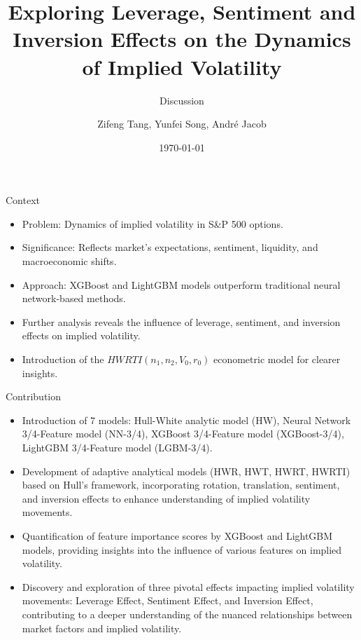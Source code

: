 \documentclass{beamer}
\title{Exploring Leverage, Sentiment and Inversion Effects on the Dynamics of Implied Volatility}
\subtitle{Discussion}
\author[Z.~Tang,~Y.Song \and A.~Jacob]{Zifeng Tang, Yunfei Song, André Jacob}
\institute[ETH/UZH]{ETH Zürich, University of Zürich}
\date{\today}
\begin{document}
\frame{\titlepage}

\begin{frame}{Context}
    \begin{itemize}
        \item Problem: Dynamics of implied volatility in S\&P 500 options.
        \item Significance: Reflects market's expectations, sentiment, liquidity, and macroeconomic shifts.
        \item Approach: XGBoost and LightGBM models outperform traditional neural network-based methods.
        \item Further analysis reveals the influence of leverage, sentiment, and inversion effects on implied volatility.
        \item Introduction of the $HWRTI(n_1, n_2, V_0, r_0)$ econometric model for clearer insights.
    \end{itemize}
\end{frame}

\begin{frame}{Contribution}
    \begin{itemize}
        \item Introduction of 7 models: Hull-White analytic model (HW), Neural Network 3/4-Feature model (NN-3/4), XGBoost 3/4-Feature model (XGBoost-3/4), LightGBM 3/4-Feature model (LGBM-3/4).
        \item Development of adaptive analytical models (HWR, HWT, HWRT, HWRTI) based on Hull's framework, incorporating rotation, translation, sentiment, and inversion effects to enhance understanding of implied volatility movements.
        \item Quantification of feature importance scores by XGBoost and LightGBM models, providing insights into the influence of various features on implied volatility.
        \item Discovery and exploration of three pivotal effects impacting implied volatility movements: Leverage Effect, Sentiment Effect, and Inversion Effect, contributing to a deeper understanding of the nuanced relationships between market factors and implied volatility.
    \end{itemize}
\end{frame}
\end{document}
